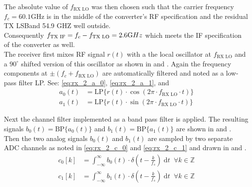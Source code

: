 The absolute value of $f_{\text{RX LO}}$ was then chosen such that the
carrier frequency $f_c = 60.1 \text{GHz}$ is in the middle of the
converter's \gls{RF} specification and the residual \gls{TX} \gls{LSBand}
54.9 GHZ well outside. \\

Consequently $f_{\text{TX IF}} = f_c - f_{\text{TX LO}} = 2.6 \text GHz$ which
meets the \gls{IF} specification of the converter as well. \\

The receiver first mixes \gls{RF} signal $r(t)$ with a the local oscillator
at $f_{\text{RX LO}}$ and a $90^\circ$ shifted version of this oscillator
as shown in  and .
Again the frequency components at $\pm (f_c + f_{\text{RX LO}})$ are
automatically filtered and noted as a low-pass filter LP.
See: \eqref{eq:rx_2_a_0}, \eqref{eq:rx_2_a_1},
 and  \\

\begin{subequations}
  \begin{alignat}{2}
    a_0(t) &= \text{LP}\{r(t) \cdot \cos(2\pi \cdot f_{\text{RX LO}} \cdot t)\}
    \label{eq:rx_2_a_0} \\
    a_1(t) &= \text{LP}\{r(t) \cdot \sin(2\pi \cdot f_{\text{RX LO}} \cdot t)\}
    \label{eq:rx_2_a_1}
  \end{alignat}
\end{subequations}

Next the channel filter implemented as a band pass filter is applied.
The resulting signals $b_0(t) = \text{BP}\{a_0(t)\}$ and
$b_1(t) = \text{BP}\{a_1(t)\}$ are shown in 
and . \\

Then the two analog signals $b_0(t)$ and $b_1(t)$ are sampled by two
separate \gls{ADC} channels as noted in \eqref{eq:rx_2_c_0} and
\eqref{eq:rx_2_c_1} and drawn in 
and . \\

\begin{subequations}
  \begin{alignat}{2}
    c_0[k] &= \int_{-\infty}^{\infty}
    b_0(t) \cdot \delta\left(t - \frac{k}{f_s}\right) \; \text{d}t
    \;\; \forall k \in \mathbb{Z}
    \label{eq:rx_2_c_0} \\
    c_1[k] &= \int_{-\infty}^{\infty}
    b_1(t) \cdot \delta\left(t - \frac{k}{f_s}\right) \; \text{d}t
    \;\; \forall k \in \mathbb{Z}
    \label{eq:rx_2_c_1}
  \end{alignat}
\end{subequations}

